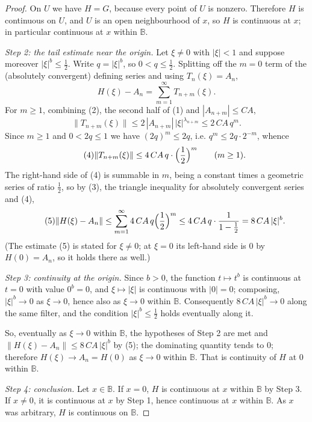 \begin{proof}
On $U$ we have $H=G$, because every point of $U$ is nonzero.  Therefore $H$ is
continuous on $U$, and $U$ is an open neighbourhood of $x$, so $H$ is
continuous at $x$; in particular continuous at $x$ within $\mathbb{B}$.

\emph{Step 2: the tail estimate near the origin.}  Let $\xi\ne0$ with
$|\xi|<1$ and suppose moreover $|\xi|^{b}\le\tfrac12$.  Write
$q=|\xi|^{b}$, so $0<q\le\tfrac12$.  Splitting off the $m=0$ term of the
(absolutely convergent) defining series and using $T_n(\xi)=A_n$,
\begin{equation}\tag{3}
  H(\xi)-A_n=\sum_{m=1}^\infty T_{n+m}(\xi).
\end{equation}
For $m\ge1$, combining (2), the second half of (1) and $|A_{n+m}|\le CA$,
\[
  \|T_{n+m}(\xi)\|
  \le2\,|A_{n+m}|\,|\xi|^{\lambda_{n+m}}
  \le2\,CA\,q^{m}.
\]
Since $m\ge1$ and $0<2q\le1$ we have $(2q)^{m}\le2q$, i.e.
$q^{m}\le2q\cdot2^{-m}$, whence
\begin{equation}\tag{4}
  \|T_{n+m}(\xi)\|\le4\,CA\,q\cdot\Bigl(\frac12\Bigr)^{m}
  \qquad(m\ge1).
\end{equation}
The right-hand side of (4) is summable in $m$, being a constant times a
geometric series of ratio $\tfrac12$, so by (3), the triangle inequality for
absolutely convergent series and (4),
\begin{equation}\tag{5}
  \|H(\xi)-A_n\|
  \le\sum_{m=1}^\infty4\,CA\,q\Bigl(\frac12\Bigr)^{m}
  \le4\,CA\,q\cdot\frac1{1-\frac12}
  =8\,CA\,|\xi|^{b}.
\end{equation}
(The estimate (5) is stated for $\xi\ne0$; at $\xi=0$ its left-hand side is
$0$ by $H(0)=A_n$, so it holds there as well.)

\emph{Step 3: continuity at the origin.}  Since $b>0$, the function
$t\mapsto t^{b}$ is continuous at $t=0$ with value $0^{b}=0$, and $\xi\mapsto|\xi|$
is continuous with $|0|=0$; composing, $|\xi|^{b}\to0$ as $\xi\to0$, hence also
as $\xi\to0$ within $\mathbb{B}$.  Consequently $8\,CA\,|\xi|^{b}\to0$ along
the same filter, and the condition $|\xi|^{b}\le\tfrac12$ holds eventually
along it.

So, eventually as $\xi\to0$ within $\mathbb{B}$, the hypotheses of Step 2 are
met and $\|H(\xi)-A_n\|\le8\,CA\,|\xi|^{b}$ by (5); the dominating quantity
tends to $0$; therefore $H(\xi)\to A_n=H(0)$ as $\xi\to0$ within
$\mathbb{B}$.  That is continuity of $H$ at $0$ within $\mathbb{B}$.

\emph{Step 4: conclusion.}  Let $x\in\mathbb{B}$.  If $x=0$, $H$ is continuous
at $x$ within $\mathbb{B}$ by Step 3.  If $x\ne0$, it is continuous at $x$ by
Step 1, hence continuous at $x$ within $\mathbb{B}$.  As $x$ was arbitrary, $H$
is continuous on $\mathbb{B}$.
\end{proof}
